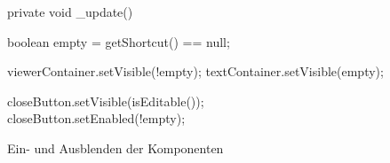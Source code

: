 \begin{wrapfigure}[11]{l}[0cm]{0.50\textwidth}
    \centering
	\vspace{-5px}
	\begin{spacing}{0.75}
		\begin{javacode}[firstnumber=205]
private void _update()
{
  boolean empty = getShortcut() == null;
	
  viewerContainer.setVisible(!empty);
  textContainer.setVisible(empty);
  
  closeButton.setVisible(isEditable());
  closeButton.setEnabled(!empty);
}		\end{javacode}
	\end{spacing}
	\caption{Ein- und Ausblenden der Komponenten}
	\label{fig:ShortcutField-update}
\end{wrapfigure}